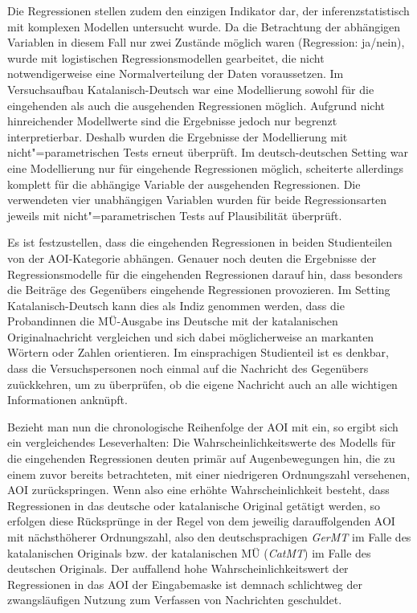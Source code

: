 Die Regressionen stellen zudem den einzigen Indikator dar, der inferenzstatistisch mit komplexen Modellen untersucht wurde. Da die Betrachtung der abhängigen Variablen in diesem Fall nur zwei Zustände möglich waren (Regression: ja/nein), wurde mit logistischen Regressionsmodellen gearbeitet, die nicht notwendigerweise eine Normalverteilung der Daten voraussetzen. Im Versuchsaufbau Katalanisch-Deutsch war eine Modellierung sowohl für die eingehenden als auch die ausgehenden Regressionen möglich. Aufgrund nicht hinreichender Modellwerte sind die Ergebnisse jedoch nur begrenzt interpretierbar. Deshalb wurden die Ergebnisse der Modellierung mit nicht"=parametrischen Tests erneut überprüft. Im deutsch-deutschen Setting war eine Modellierung nur für eingehende Regressionen möglich, scheiterte allerdings komplett für die abhängige Variable der ausgehenden Regressionen. Die verwendeten vier unabhängigen Variablen wurden für beide Regressionsarten jeweils mit nicht"=parametrischen Tests auf Plausibilität überprüft.

Es ist festzustellen, dass die eingehenden Regressionen in beiden Studienteilen von der AOI-Kategorie abhängen. Genauer noch deuten die Ergebnisse der Regressionsmodelle für die eingehenden Regressionen darauf hin, dass besonders die Beiträge des Gegenübers eingehende Regressionen provozieren. Im Setting Katalanisch-Deutsch kann dies als Indiz genommen werden, dass die Proband{\textperiodcentered}innen die MÜ-Ausgabe ins Deutsche mit der katalanischen Originalnachricht vergleichen und sich dabei möglicherweise an markanten Wörtern oder Zahlen orientieren. Im einsprachigen Studienteil ist es denkbar, dass die Versuchspersonen noch einmal auf die Nachricht des Gegenübers zuückkehren, um zu überprüfen, ob die eigene Nachricht auch an alle wichtigen Informationen anknüpft. 

Bezieht man nun die chronologische Reihenfolge der AOI mit ein, so ergibt sich ein vergleichendes Leseverhalten: Die Wahrscheinlichkeitswerte des Modells für die eingehenden Regressionen deuten primär auf Augenbewegungen hin, die zu einem zuvor bereits betrachteten, mit einer niedrigeren Ordnungszahl versehenen, AOI zurückspringen. Wenn also eine erhöhte Wahrscheinlichkeit besteht, dass Regressionen in das deutsche oder katalanische Original getätigt werden, so erfolgen diese Rücksprünge in der Regel von dem jeweilig darauffolgenden AOI mit nächsthöherer Ordnungszahl, also den deutschsprachigen \emph{GerMT} im Falle des katalanischen Originals bzw. der katalanischen MÜ (\emph{CatMT}) im Falle des deutschen Originals. Der auffallend hohe Wahrscheinlichkeitswert der Regressionen in das AOI der Eingabemaske ist demnach schlichtweg der zwangsläufigen Nutzung zum Verfassen von Nachrichten geschuldet.

